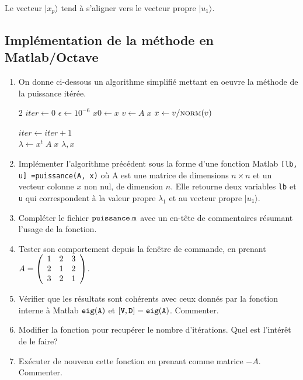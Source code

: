 \documentclass[a4paper, 12pt]{article}
\begin{document}
Le vecteur $|x_p \rangle$ tend à s'aligner vers le vecteur propre $|u_1 \rangle$.
\subsection{Implémentation de la méthode en Matlab/Octave}

\begin{enumerate}
\item On donne ci-dessous un algorithme simplifié mettant en oeuvre la méthode de la puissance itérée.


\begin{algorithmic}[1]
\begin{multicols}{2}
{}
     \State $iter \gets 0$   
\State $\epsilon \gets 10^{-6} $
        \Repeat
    \State $x0 \gets x$
    \State $v \gets A \; x $
    \State $x \gets v /  \Call{norm}{v} $  

     \State $iter \gets iter+1$   
 \\           
\State $\lambda \gets x^t\; A\;  x$ 
    \State \Return $\lambda, x$
\EndFunction
\end{multicols}
\end{algorithmic}


\item Implémenter l'algorithme précédent sous la forme d'une fonction Matlab {\tt [lb, u] =puissance(A, x)} où A est une matrice de dimensions $n \times n$ et un vecteur colonne $x$ 
non nul, de dimension $n$.
Elle retourne deux variables 
{\tt lb} et {\tt u} qui correspondent à la valeur propre $\lambda_1$ et au vecteur propre $|u_1 \rangle$.

\item  Compléter le fichier $\tt{puissance.m} \rm$ avec un en-tête de commentaires résumant 
l'usage de la fonction. 

\item Tester son comportement depuis la fenêtre de commande, en prenant 
$A =
\left (
\begin{array}{c c c} 1 & 2 & 3 \\ 2 & 1 & 2 \\ 3 & 2 & 1 \end{array}
\right ) 
$.

\item Vérifier que les résultats sont cohérents avec ceux donnés par la fonction interne à
Matlab $\tt{eig(A)} \rm$ et $\tt{[V, D] = eig(A)} \rm$. Commenter.
\item Modifier la fonction pour recupérer le nombre d'itérations. Quel est l'intérêt de le faire?
\item Exécuter de nouveau cette fonction en prenant comme matrice $-A$.  Commenter.


\end{enumerate}
\end{document}
